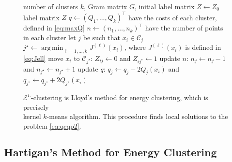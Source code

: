 \documentclass[aps,preprint,nofootinbib,floatfix]{revtex4-1}
\DeclareMathOperator*{\argmin}{arg\,min}
\newcommand\C{{\mathcal{C}}}
\begin{document}
\begin{figure}
\begin{flushleft}
\begin{algorithm}[H]
\vspace{.5em}
\begin{algorithmic}[1]
    \INPUT number of clusters $k$, Gram matrix $G$, initial label
    matrix $Z \leftarrow Z_0$
    \OUTPUT label matrix $Z$ 
  \STATE $q \leftarrow (Q_1, \dotsc, Q_k)^\top$ 
            have the costs of each cluster, defined in \eqref{eq:maxQ}
  \STATE $n \leftarrow (n_1,\dotsc,n_k)^\top$ 
        have the number of points in each cluster%
  \REPEAT
        \STATE let $j$ be such that $x_i \in \C_j$
        \STATE $j^\star \leftarrow \argmin_{\ell=1,\dotsc,k} J^{(\ell)}(x_i)$,
            where $J^{(\ell)}(x_i)$ is defined in \eqref{eq:Jell}
            \STATE move $x_i$ to $\C_{j^\star}$: $Z_{ij} \leftarrow 0$ and
            $Z_{ij^\star} \leftarrow 1$
            \STATE update $n$: $n_j \leftarrow n_j - 1$ and
                    $n_{j^\star} \leftarrow n_{j^\star} + 1$
            \STATE update $q$: $q_j \leftarrow q_j - 2Q_j(x_i)$ and
    $q_{j^\star} \leftarrow q_{j^\star} + 2Q_{j^\star}(x_i)$
        \ENDIF
    \ENDFOR
\end{algorithmic}
\caption{\label{kmeans_algo}
$\mathcal{E}^{L}$-clustering is Lloyd's method for energy clustering, which
is precisely~~~~~~~~ \\ 
kernel $k$-means algorithm. This procedure finds
local solutions to the problem \eqref{eq:qcqp2}.\hspace{\fill}
}
\end{algorithm}
\end{flushleft}
\end{figure}

\subsection*{Hartigan's Method for Energy Clustering}

\end{document}
